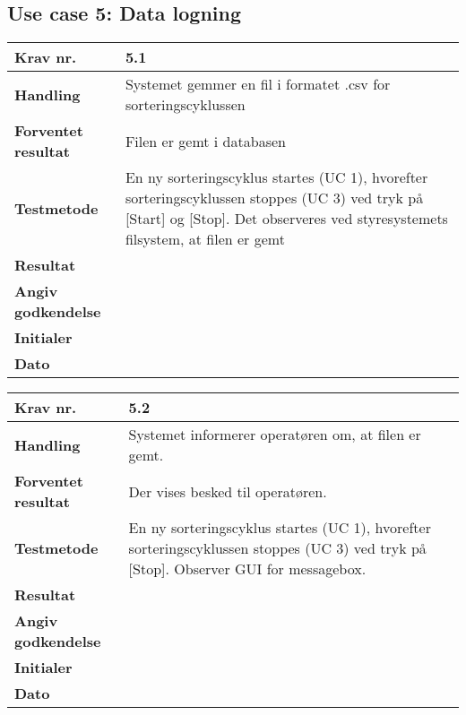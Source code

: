 \newpage
  \subsection{Use case 5: Data logning}

	\begin{center}
		\begin{longtable}{ | m{4cm}| m{8.5cm}|} 
			\hline
			\textbf{Krav nr.} & 5.1 \\ 
			\hline
			\textbf{Handling} & Systemet gemmer en fil i formatet .csv for sorteringscyklussen  \\
			\hline
			\textbf{Forventet resultat} & Filen er gemt i databasen  \\
			\hline
			\textbf{Testmetode}  & En ny sorteringscyklus startes (UC 1), hvorefter sorteringscyklussen stoppes (UC 3) ved tryk på [Start] og [Stop]. Det observeres ved styresystemets filsystem, at filen er gemt  \\
			\hline
			\textbf{Resultat}  &    \\
			\hline
			\textbf{Angiv godkendelse} &     \\
			\hline
			\textbf{Initialer} &     \\
			\hline
			\textbf{Dato} &    \\
			\hline
		\end{longtable}
	\end{center}			

	\begin{center}
		\begin{longtable}{ | m{4cm}| m{8.5cm}|} 
			\hline
			\textbf{Krav nr.} & 5.2 \\ 
			\hline
			\textbf{Handling} & Systemet informerer operatøren om, at filen er gemt.  \\
			\hline
			\textbf{Forventet resultat} & Der vises besked til operatøren.  \\
			\hline
			\textbf{Testmetode}  & En ny sorteringscyklus startes (UC 1), hvorefter sorteringscyklussen stoppes (UC 3) ved tryk på [Stop]. Observer GUI for messagebox.  \\
			\hline
			\textbf{Resultat}  &    \\
			\hline
			\textbf{Angiv godkendelse} &     \\
			\hline
			\textbf{Initialer} &     \\
			\hline
			\textbf{Dato} &    \\
			\hline
		\end{longtable}
	\end{center}